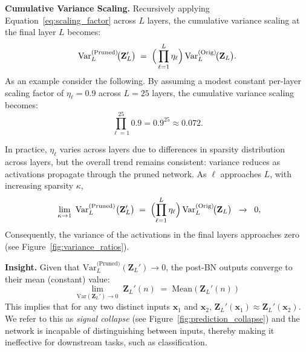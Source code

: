 \noindent
\textbf{Cumulative Variance Scaling.}
Recursively applying Equation~\ref{eq:scaling_factor} across \(L\) layers, the cumulative variance scaling at the final layer $L$ becomes:
\begin{equation}
    \mathrm{Var}_L^{\text{(Pruned)}}\!\bigl(\mathbf{Z}_L'\bigr)
    \;=\;
    \Bigl(\,\prod_{\ell=1}^L \eta_\ell\Bigr)
    \,\mathrm{Var}_L^{\text{(Orig)}}\!\bigl(\mathbf{Z}_L\bigr).
    \label{eq:cumulative_variance}
\end{equation}
As an example consider the following. 
By assuming a modest constant per-layer scaling factor of \(\eta_\ell = 0.9\) across \(L = 25\) layers, the cumulative variance scaling becomes:
\begin{equation}
    \prod_{\ell=1}^{25} 0.9 = 0.9^{25} \approx 0.072.
    \label{eq:example_cumulative_variance}
\end{equation}


In practice, \(\eta_\ell\) varies across layers due to differences in sparsity distribution across layers, but the overall trend remains consistent: variance reduces as activations propagate through the pruned network. As \(\ell\) approaches \(L\), with increasing sparsity  \(\kappa\), 
\begin{equation}
    \;\;\lim_{\kappa \to 1}\;
    \mathrm{Var}_L^{\text{(Pruned)}}\bigl(\mathbf{Z}_L'\bigr)
    \;=\;
    \Bigl(\prod_{\ell=1}^L \eta_\ell\Bigr)\,
    \mathrm{Var}_L^{\text{(Orig)}}\!\bigl(\mathbf{Z}_L\bigr)
    \;\;\xrightarrow{}\;\;
    0,
    \label{eq:variance_approaching_zero}
\end{equation}
Consequently, the variance of the activations in the final layers approaches zero (see Figure~\ref{fig:variance_ratios}). 

\noindent
\textbf{Insight.}
Given that \(\mathrm{Var}_L^{\text{(Pruned)}}(\mathbf{Z}_L') \to 0\), the post-BN outputs converge to their mean (constant) value:
\begin{equation}
    \lim_{\mathrm{Var}(\mathbf{Z}_L') \to 0} 
    \;\mathbf{Z}_L'(n) 
    \;=\; 
    \mathrm{Mean}(\mathbf{Z}_L'(n))
    \label{eq:constant_activation}
\end{equation}
This implies that for any two distinct inputs \(\mathbf{x}_1\) and \(\mathbf{x}_2\),
$\mathbf{Z}_L'(\mathbf{x}_1) \approx \mathbf{Z}_L'(\mathbf{x}_2)$. We refer to this as \textit{signal collapse} (see Figure~\ref{fig:prediction_collapse}) and the network is incapable of distinguishing between inputs, thereby making it ineffective for downstream tasks, such as classification.





